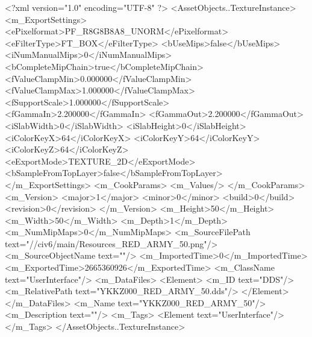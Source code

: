 <?xml version="1.0" encoding="UTF-8" ?>
<AssetObjects..TextureInstance>
	<m_ExportSettings>
		<ePixelformat>PF_R8G8B8A8_UNORM</ePixelformat>
		<eFilterType>FT_BOX</eFilterType>
		<bUseMips>false</bUseMips>
		<iNumManualMips>0</iNumManualMips>
		<bCompleteMipChain>true</bCompleteMipChain>
		<fValueClampMin>0.000000</fValueClampMin>
		<fValueClampMax>1.000000</fValueClampMax>
		<fSupportScale>1.000000</fSupportScale>
		<fGammaIn>2.200000</fGammaIn>
		<fGammaOut>2.200000</fGammaOut>
		<iSlabWidth>0</iSlabWidth>
		<iSlabHeight>0</iSlabHeight>
		<iColorKeyX>64</iColorKeyX>
		<iColorKeyY>64</iColorKeyY>
		<iColorKeyZ>64</iColorKeyZ>
		<eExportMode>TEXTURE_2D</eExportMode>
		<bSampleFromTopLayer>false</bSampleFromTopLayer>
	</m_ExportSettings>
	<m_CookParams>
		<m_Values/>
	</m_CookParams>
	<m_Version>
		<major>1</major>
		<minor>0</minor>
		<build>0</build>
		<revision>0</revision>
	</m_Version>
	<m_Height>50</m_Height>
	<m_Width>50</m_Width>
	<m_Depth>1</m_Depth>
	<m_NumMipMaps>0</m_NumMipMaps>
	<m_SourceFilePath text="//civ6/main/Resources_RED_ARMY_50.png"/>
	<m_SourceObjectName text=""/>
	<m_ImportedTime>0</m_ImportedTime>
	<m_ExportedTime>2665360926</m_ExportedTime>
	<m_ClassName text="UserInterface"/>
	<m_DataFiles>
		<Element>
			<m_ID text="DDS"/>
			<m_RelativePath text="YKKZ000_RED_ARMY_50.dds"/>
		</Element>
	</m_DataFiles>
	<m_Name text="YKKZ000_RED_ARMY_50"/>
	<m_Description text=""/>
	<m_Tags>
		<Element text="UserInterface"/>
	</m_Tags>
</AssetObjects..TextureInstance>

